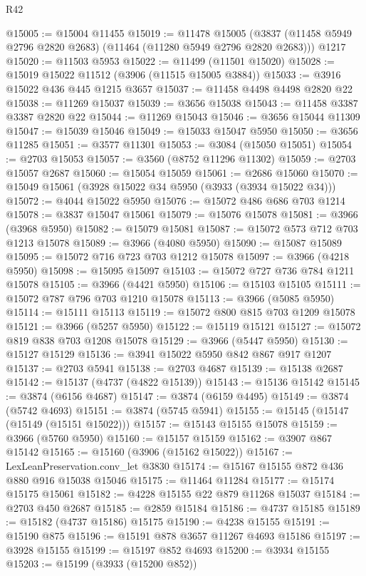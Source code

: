 \begin{lexlean}{R42}
\begin{coremodule}
@15005 := @15004 @11455
@15019 := @11478
    @15005
    (@3837 (@11458 @5949 @2796 @2820 @2683) (@11464 (@11280 @5949 @2796 @2820 @2683)))
    @1217
@15020 := @11503 @5953
@15022 := @11499 (@11501 @15020)
@15028 := @15019 @15022 @11512 (@3906 (@11515 @15005 @3884))
@15033 := @3916 @15022 @436 @445 @1215 @3657
@15037 := @11458 @4498 @4498 @2820 @22
@15038 := @11269 @15037
@15039 := @3656 @15038
@15043 := @11458 @3387 @3387 @2820 @22
@15044 := @11269 @15043
@15046 := @3656 @15044 @11309
@15047 := @15039 @15046
@15049 := @15033 @15047 @5950
@15050 := @3656 @11285
@15051 := @3577 @11301
@15053 := @3084 (@15050 @15051)
@15054 := @2703 @15053
@15057 := @3560 (@8752 @11296 @11302)
@15059 := @2703 @15057 @2687
@15060 := @15054 @15059
@15061 := @2686 @15060
@15070 := @15049 @15061 (@3928 @15022 @34 @5950 (@3933 (@3934 @15022 @34)))
@15072 := @4044 @15022 @5950
@15076 := @15072 @486 @686 @703 @1214
@15078 := @3837 @15047 @15061
@15079 := @15076 @15078
@15081 := @3966 (@3968 @5950)
@15082 := @15079 @15081
@15087 := @15072 @573 @712 @703 @1213 @15078
@15089 := @3966 (@4080 @5950)
@15090 := @15087 @15089
@15095 := @15072 @716 @723 @703 @1212 @15078
@15097 := @3966 (@4218 @5950)
@15098 := @15095 @15097
@15103 := @15072 @727 @736 @784 @1211 @15078
@15105 := @3966 (@4421 @5950)
@15106 := @15103 @15105
@15111 := @15072 @787 @796 @703 @1210 @15078
@15113 := @3966 (@5085 @5950)
@15114 := @15111 @15113
@15119 := @15072 @800 @815 @703 @1209 @15078
@15121 := @3966 (@5257 @5950)
@15122 := @15119 @15121
@15127 := @15072 @819 @838 @703 @1208 @15078
@15129 := @3966 (@5447 @5950)
@15130 := @15127 @15129
@15136 := @3941 @15022 @5950 @842 @867 @917 @1207
@15137 := @2703 @5941
@15138 := @2703 @4687
@15139 := @15138 @2687
@15142 := @15137 (@4737 (@4822 @15139))
@15143 := @15136 @15142
@15145 := @3874 (@6156 @4687)
@15147 := @3874 (@6159 @4495)
@15149 := @3874 (@5742 @4693)
@15151 := @3874 (@5745 @5941)
@15155 := @15145 (@15147 (@15149 (@15151 @15022)))
@15157 := @15143 @15155 @15078
@15159 := @3966 (@5760 @5950)
@15160 := @15157 @15159
@15162 := @3907 @867 @15142
@15165 := @15160 (@3906 (@15162 @15022))
@15167 := LexLeanPreservation.conv_let @3830
@15174 := @15167 @15155 @872 @436 @880 @916 @15038 @15046
@15175 := @11464 @11284
@15177 := @15174 @15175 @15061
@15182 := @4228 @15155 @22 @879 @11268 @15037
@15184 := @2703 @450 @2687
@15185 := @2859 @15184
@15186 := @4737 @15185
@15189 := @15182 (@4737 @15186) @15175
@15190 := @4238 @15155
@15191 := @15190 @875
@15196 := @15191 @878 @3657 @11267 @4693 @15186
@15197 := @3928 @15155
@15199 := @15197 @852 @4693
@15200 := @3934 @15155
@15203 := @15199 (@3933 (@15200 @852))

\end{coremodule}
\end{lexlean}
